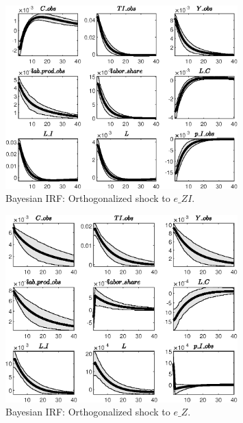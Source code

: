  
\begin{figure}[H]
\centering 
\includegraphics[width=0.80\textwidth]{directed_search_est_alt_obs/Output/directed_search_est_alt_obs_Bayesian_IRF_e_ZI_1}
\caption{Bayesian IRF: Orthogonalized shock to $e\_ZI$.}
\label{Fig:BayesianIRF:e_ZI:1}
\end{figure}
 
\begin{figure}[H]
\centering 
\includegraphics[width=0.80\textwidth]{directed_search_est_alt_obs/Output/directed_search_est_alt_obs_Bayesian_IRF_e_Z_1}
\caption{Bayesian IRF: Orthogonalized shock to $e\_Z$.}
\label{Fig:BayesianIRF:e_Z:1}
\end{figure}
 
